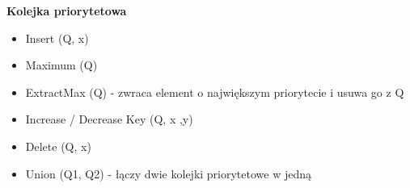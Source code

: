 \documentclass{article}
\begin{document}
\textbf{Kolejka priorytetowa} \par
\begin{itemize}
    \item Insert (Q, x)
    \item Maximum (Q)
    \item ExtractMax (Q) - zwraca element o największym priorytecie i usuwa go z Q
    \item Increase / Decrease Key (Q, x ,y)
    \item Delete (Q, x)
    \item Union (Q1, Q2) - łączy dwie kolejki priorytetowe w jedną
\end{itemize}
\end{document}
